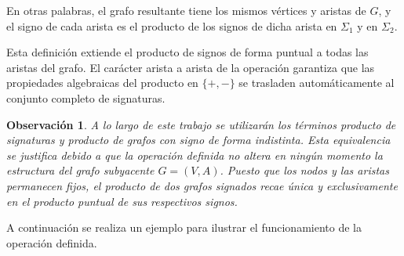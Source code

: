 \documentclass[11pt,a4paper,spanish]{report}
\theoremstyle{plain}
\newtheorem{nota}{Observación}
\begin{document}
En otras palabras, el grafo resultante tiene los mismos vértices y aristas de $G$,
y el signo de cada arista es el producto de los signos de dicha arista en 
$\Sigma_1$ y en $\Sigma_2$.

Esta definición extiende el producto de signos de forma puntual a todas las
aristas del grafo. El carácter arista a arista de la operación garantiza que
las propiedades algebraicas del producto en $\{+,-\}$ se trasladen
automáticamente al conjunto completo de signaturas.
\begin{nota}
A lo largo de este trabajo se utilizarán los términos producto de signaturas y producto de grafos con signo de forma indistinta. Esta equivalencia se justifica debido a que la operación definida no altera en ningún momento la estructura del grafo subyacente $G=(V,A)$. Puesto que los nodos y las aristas permanecen fijos, el producto de dos grafos signados recae única y exclusivamente en el producto puntual de sus respectivos signos. 
\end{nota}



A continuación se realiza un ejemplo para ilustrar el funcionamiento de la operación definida. 
\end{document}
